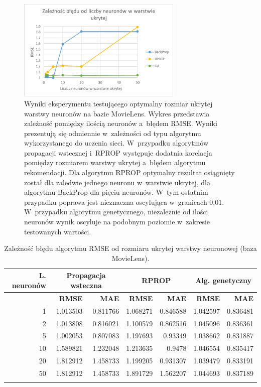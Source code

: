 \documentclass[twoside]{iisthesis}
\begin{document}
			\begin{figure}[H]
				\centering
				\includegraphics[width=0.7\textwidth]{exphiddenneural}
				\caption{Wyniki eksperymentu testującego optymalny rozmiar ukrytej warstwy neuronów na bazie MovieLens. Wykres przedstawia zależność pomiędzy ilością neuronów a~błędem RMSE. Wyniki prezentują się odmiennie w~zależności od typu algorytmu wykorzystanego do uczenia sieci. W~przypadku algorytmów propagacji wstecznej i~RPROP występuje dodatnia korelacja pomiędzy rozmiarem warstwy ukrytej a~błędem algorytmu rekomendacji. Dla algorytmu RPROP optymalny rezultat osiągnięty został dla zaledwie jednego neuronu w~warstwie ukrytej, dla algorytmu BackProp dla pięciu neuronów. W~tym ostatnim przypadku poprawa jest nieznaczna oscylująca w~granicach 0,01. W~przypadku algorytmu genetycznego, niezależnie od ilości neuronów wynik oscyluje na podobnym poziomie w~zakresie testowanych wartości.}
				\label{fig:exphiddenneural}
			\end{figure}
			
			\begin{longtable}{r||rr|rr|rr}
				\label{tab:exphiddenneural}
				\centering
				\textbf{L. neuronów} &  \multicolumn{2}{c|}{\textbf{Propagacja wsteczna}}  & \multicolumn{2}{c|}{\textbf{RPROP}} & \multicolumn{2}{c}{\textbf{Alg. genetyczny}}  \\
				\hline
				& \textbf{RMSE} & \textbf{MAE} & \textbf{RMSE} & \textbf{MAE} & \textbf{RMSE} & \textbf{MAE} \\
				\hline
				1                                   & 1.013503                          & 0.811766 & 1.068271 & 0.846588 & 1.042597 & 0.836481 \\
				2                                   & 1.013808                          & 0.816021 & 1.100579 & 0.862516 & 1.045096 & 0.836361 \\
				5                                   & 1.002053                          & 0.807083 & 1.197693 & 0.93349  & 1.038662 & 0.831887 \\
				10                                  & 1.589821                          & 1.232048 & 1.213635 & 0.9478   & 1.046554 & 0.835417 \\
				20                                  & 1.812912                          & 1.458733 & 1.199205 & 0.931307 & 1.039479 & 0.833191 \\
				50                                  & 1.812912                          & 1.458733 & 1.891729 & 1.562207 & 1.044693 & 0.837189\\		
				\caption{Zależność błędu algorytmu RMSE od rozmiaru ukrytej warstwy neuronowej (baza MovieLens).}
			\end{longtable}
		
\end{document}
